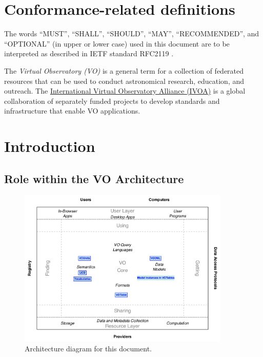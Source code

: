 \documentclass[11pt,a4paper]{ivoa}
\begin{document}
\section*{Conformance-related definitions}

The words ``MUST'', ``SHALL'', ``SHOULD'', ``MAY'', ``RECOMMENDED'', and
``OPTIONAL'' (in upper or lower case) used in this document are to be
interpreted as described in IETF standard RFC2119 \citep{std:RFC2119}.

The \emph{Virtual Observatory (VO)} is a
general term for a collection of federated resources that can be used
to conduct astronomical research, education, and outreach.
The \href{http://www.ivoa.net}{International
Virtual Observatory Alliance (IVOA)} is a global
collaboration of separately funded projects to develop standards and
infrastructure that enable VO applications.

\pagebreak
\section{Introduction}



\subsection{Role within the VO Architecture}

\begin{figure}[h]
\centering


\includegraphics[width=0.9\textwidth]{role_diagram.pdf}
\caption{Architecture diagram for this document.}
\label{fig:archdiag}
\end{figure}
\end{document}
